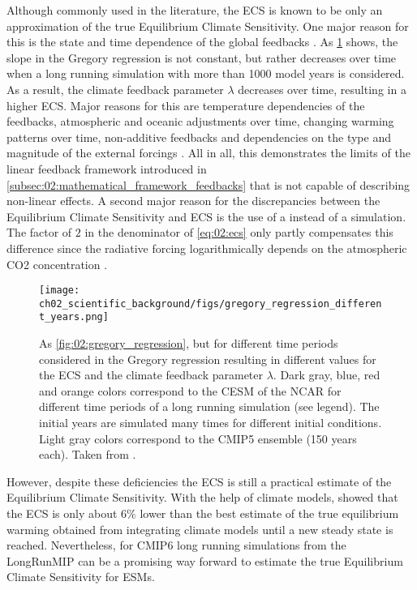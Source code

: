 Although commonly used in the literature, the \ac{ECS} is known to be only an
approximation of the true Equilibrium Climate Sensitivity. One major reason for
this is the state and time dependence of the global feedbacks
\autocite{Knutti2015, Knutti2017}. As
\cref{fig:02:gregory_regression_different_years} shows, the slope in the
Gregory regression is not constant, but rather decreases over time when a long
running  simulation with more than 1000 model years is considered.
As a result, the climate feedback parameter $\lambda$ decreases over time,
resulting in a higher \ac{ECS}. Major reasons for this are temperature
dependencies of the feedbacks, atmospheric and oceanic adjustments over time,
changing warming patterns over time, non-additive feedbacks and dependencies on
the type and magnitude of the external forcings \autocite{Knutti2017}. All in
all, this demonstrates the limits of the linear feedback framework introduced
in \cref{subsec:02:mathematical_framework_feedbacks} that is not capable of
describing non-linear effects. A second major reason for the discrepancies
between the Equilibrium Climate Sensitivity and \ac{ECS} is the use of a
 instead of a  simulation. The factor of $2$ in the
denominator of \cref{eq:02:ecs} only partly compensates this difference since
the radiative forcing logarithmically depends on the atmospheric \ac{CO2}
concentration \autocite{Huang2014}.

\begin{figure}[t]
  \centering
  \texttt{[image: 
    ch02\_scientific\_background/figs/gregory\_regression\_different\_years.png]}
  \caption{As \cref{fig:02:gregory_regression}, but for different time periods
    considered in the Gregory regression resulting in different values for the
    \acf{ECS} and the climate feedback parameter $\lambda$. Dark gray, blue,
    red and orange colors correspond to the \acf{CESM} of the \acf{NCAR} for
    different time periods of a long running simulation (see legend). The
    initial years are simulated many times for different initial conditions.
    Light gray colors correspond to the \acs{CMIP}5 ensemble (150 years each).
    Taken from \textcite{Knutti2017}.}
  \label{fig:02:gregory_regression_different_years}
\end{figure}

However, despite these deficiencies the \ac{ECS} is still a practical estimate
of the Equilibrium Climate Sensitivity. With the help of climate models,
\textcite{Sherwood2020} showed that the \ac{ECS} is only about $6 \unit{\%}$
lower than the best estimate of the true equilibrium warming obtained from
integrating climate models until a new steady state is reached. Nevertheless,
for \acs{CMIP}6 long running simulations from the \ac{LongRunMIP}
\autocite{Rugenstein2019} can be a promising way forward to estimate the true
Equilibrium Climate Sensitivity for \acp{ESM}.


